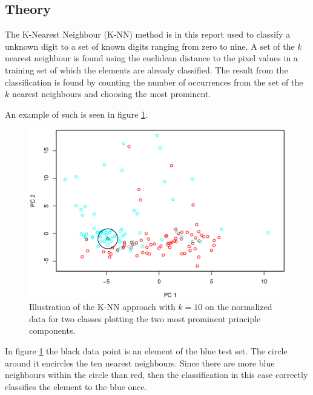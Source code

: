 \subsection{Theory}
The K-Nearest Neighbour (K-NN) method is in this report used to classify a unknown digit to a set of known digits ranging from zero to nine.
A set of the $k$ nearest neighbour is found using the euclidean distance to the pixel values in a training set of which the elements are already classified.
The result from the classification is found by counting the number of occurrences from the set of the $k$ nearest neighbours and choosing the most prominent.


An example of such is seen in figure \ref{fig:knn_illustration}.

\begin{figure}[H]
\centering
\includegraphics[width = 0.8 \textwidth]{graphics/knn_vis}
\caption[Illustration of the K-NN approach.]{Illustration of the K-NN approach with $k = 10$ on the normalized data for two classes plotting the two most prominent principle components.}
\label{fig:knn_illustration}
\end{figure}

In figure \ref{fig:knn_illustration} the black data point is an element of the blue test set.
The circle around it encircles the ten nearest neighbours.
Since there are more blue neighbours within the circle than red, then the classification in this case correctly classifies the element to the blue once.

